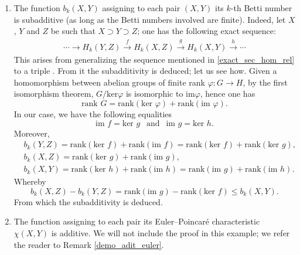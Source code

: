 \begin{example}
\label{betti_subad}
    \hfill
    \begin{enumerate}[label=(\roman*)]
        \item The function $b_k(X,Y)$ assigning to each pair $(X,Y)$ its $k$-th Betti number is subadditive (as long as the Betti numbers involved are finite). Indeed, let $X$, $Y$ and $Z$ be such that $X\supset Y\supset Z$; one has the following exact sequence:
        \begin{align*}
            \cdots \longrightarrow H_k(Y,Z) \overset{f}{\longrightarrow} H_k(X,Z) \overset{g}{\longrightarrow} H_k(X,Y) \overset{h}{\longrightarrow} \cdots
        \end{align*}
        This arises from generalizing the sequence mentioned in \ref{exact_sec_hom_rel} to a triple \cite[p.~118]{hatcher2002}. From it the subadditivity is deduced; let us see how. Given a homomorphism between abelian groups of finite rank $\varphi: G\to H$, by the first isomorphism theorem, $G/\text{ker}\varphi$ is isomorphic to $\text{im} \varphi$, hence one has
        \begin{equation*}
            \text{rank } G = \text{rank}(\text{ker } \varphi) + \text{rank}(\text{im } \varphi).
        \end{equation*}
        In our case, we have the following equalities
        \begin{equation*}
            \text{im } f = \text{ker } g ~~\text{ and }~~ \text{im } g = \text{ker } h.
        \end{equation*}
        Moreover,
        \begin{align*}
            &b_k(Y,Z) = \text{rank}(\text{ker } f) + \text{rank}(\text{im } f) = \text{rank}(\text{ker } f) + \text{rank}(\text{ker } g),\\
            &b_k(X,Z) = \text{rank}(\text{ker } g) + \text{rank}(\text{im } g),\\
            &b_k(X,Y) = \text{rank}(\text{ker } h) + \text{rank}(\text{im } h) = \text{rank}(\text{im } g) + \text{rank}(\text{im } h).
        \end{align*}
        Whereby
        \begin{equation*}
            b_k(X,Z) - b_k(Y,Z) = \text{rank}(\text{im } g) - \text{rank}(\text{ker } f) \le b_k(X,Y).
        \end{equation*}
        From which the subadditivity is deduced.
        \item The function assigning to each pair its Euler--Poincaré characteristic $\chi (X,Y)$ is additive. We will not include the proof in this example; we refer the reader to Remark \ref{demo_adit_euler}.
    \end{enumerate}
\end{example}

